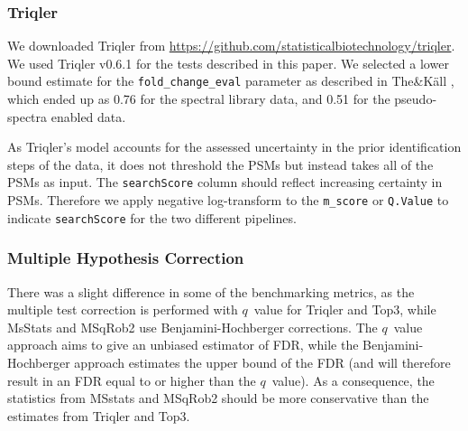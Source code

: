 \documentclass[10pt,letterpaper]{article}
\begin{document}
\subsubsection*{Triqler}

We downloaded Triqler from \url{https://github.com/statisticalbiotechnology/triqler}. We used Triqler v0.6.1 for the tests described in this paper. We selected a lower bound estimate for the \texttt{fold\_change\_eval} parameter as described in The\&K\"{a}ll \cite{the2021triqler}, which ended up as 0.76 for the spectral library data, and 0.51 for the pseudo-spectra enabled data.

As Triqler's model accounts for the assessed uncertainty in the prior identification steps of the data, it does not threshold the PSMs but instead takes all of the PSMs as input. The \texttt{searchScore} column should reflect increasing certainty in PSMs. Therefore we apply negative log-transform to the \texttt{m\_score} or \texttt{Q.Value} to indicate \texttt{searchScore} for the two different pipelines. 

\subsubsection*{Multiple Hypothesis Correction}
There was a slight difference in some of the benchmarking metrics, as the multiple test correction is performed with $q$~value for Triqler and Top3, while MsStats and MSqRob2 use Benjamini-Hochberger \cite{benjamini1995controlling} corrections. The $q$~value approach aims to give an unbiased estimator of FDR, while the Benjamini-Hochberger approach estimates the upper bound of the FDR (and will therefore result in an FDR equal to or higher than the $q$~value). As a consequence, the statistics from MSstats and MSqRob2 should be more conservative than the estimates from Triqler and Top3\cite{korthauer2019practical}.

\end{document}
